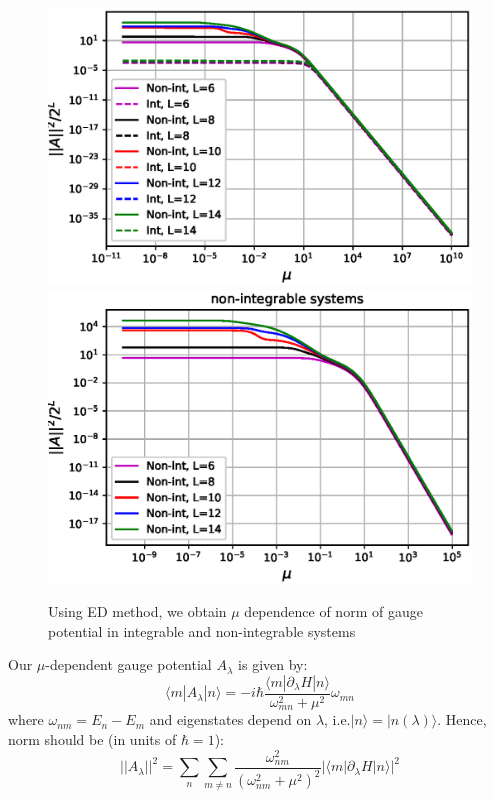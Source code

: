 \documentclass[11pt,a4paper]{article}
\begin{document}
\begin{figure}[!ht]
\begin{center}
\includegraphics[scale=0.7]{new_pics/v2_norm_mu_scaling.eps} \\
\includegraphics[scale=0.7]{new_pics/v2_norm_mu_scaling_nonint.eps}\\
\caption{Using ED method, we obtain  $\mu$ dependence of norm of gauge potential in integrable and non-integrable systems}
\label{mu_scaling}
\end{center}
\end{figure}



Our $\mu$-dependent gauge potential $A_{\lambda}$ is given by:
\begin{equation}
\langle m |A_{\lambda} | n \rangle =  -i \hbar \dfrac{\langle m |\partial_{\lambda}H | n \rangle}{\omega_{mn}^2+ \mu^2} \omega_{mn}
\end{equation}
where $\omega_{nm}=E_n-E_m$ and eigenstates depend on $\lambda$, i.e.$|n \rangle= |n (\lambda) \rangle $. Hence, norm should be (in units of $\hbar=1$):
\begin{equation}
||A_{\lambda}||^2 = \sum_n \sum_{m \neq n}  \dfrac{\omega_{nm}^2}{(\omega_{nm}^2 + \mu^2)^2} |\langle m | \partial_{\lambda}H| n \rangle|^2
\end{equation}
\end{document}
